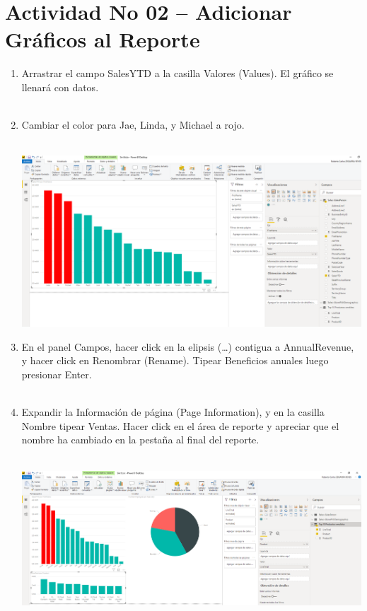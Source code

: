 \section{Actividad No 02 – Adicionar Gráficos al Reporte} 

\begin{enumerate}[1.]
	\item Arrastrar el campo SalesYTD a la casilla Valores (Values). El gráfico se llenará con datos.
	\\
	\\
	
	\item Cambiar el color para Jae, Linda, y Michael a rojo.
	\\
	\\

	\begin{center}
	\includegraphics[width=16cm]{./Imagenes/Imagen3} 
	\end{center}

	\clearpage
	\item En el panel Campos, hacer click en la elipsis (…) contigua a AnnualRevenue, y hacer click en Renombrar (Rename). Tipear Beneficios anuales luego presionar Enter.
	\\
\\

	\item Expandir la Información de página (Page Information), y en la casilla Nombre tipear Ventas. Hacer click en el área de reporte y apreciar que el nombre ha cambiado en la pestaña al final del reporte.
	\\
	\\
	\begin{center}
	\includegraphics[width=16cm]{./Imagenes/Imagen4} 
	\end{center}


\end{enumerate}
